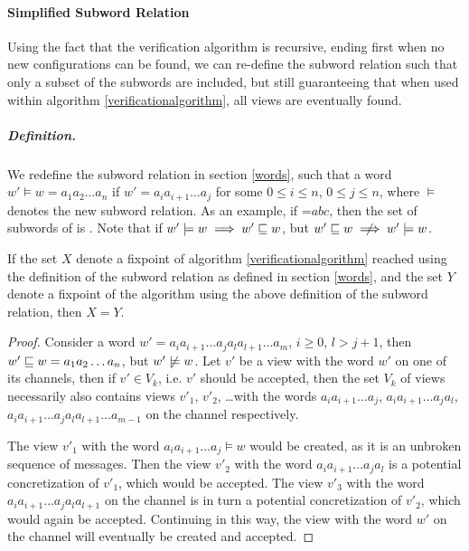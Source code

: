 \paragraph{Simplified Subword Relation}
Using the fact that the verification algorithm is recursive, ending first when no new configurations can be found, we can re-define the subword relation such that only a subset of the subwords are included, but still guaranteeing that when used within algorithm \ref{verificationalgorithm}, all views are eventually found.

\subparagraph{Definition.} 
\label{newsubword}
We redefine the subword relation in section \ref{words}, such that a word $w' \models w = a_1a_2\ldots a_n$ if $w' = a_ia_{i+1}\ldots a_j$ for some $0 \leq i \leq n$, $0 \leq j \leq n$, where $\models$ denotes the new subword relation. As an example, if =$abc$, then the set of subwords of  is . Note that if $w' \models w \implies w' \sqsubseteq w$, but $w' \subword w \centernot\implies w' \models w$. 

\begin{lemma}
If the set $X$ denote a fixpoint of algorithm \ref{verificationalgorithm} reached using the definition of the subword relation as defined in section \ref{words}, and the set $Y$ denote a fixpoint of the algorithm using the above definition of the subword relation, then $X=Y$.
\end{lemma}

\begin{proof}
Consider a word $w' = a_ia_{i+1}\ldots a_ja_la_{l+1}\ldots a_m$, $i \geq 0$, $l > j+1$, then $w' \sqsubseteq w = a_1a_2\ldots a_n$, but $w' \centernot\models w$.
Let $v'$ be a view with the word $w'$ on one of its channels, then if $v' \in V_k$, i.e. $v'$ should be accepted, then the set $V_k$ of views necessarily also contains views $v'_1$, $v'_2$, \ldots with the words $a_ia_{i+1}\ldots a_j$, $a_ia_{i+1}\ldots a_ja_l$, $a_ia_{i+1}\ldots a_ja_la_{l+1}\ldots a_{m-1}$ on the channel respectively.

The view $v'_1$ with the word $a_ia_{i+1}\ldots a_j \models w$ would be created, as it is an unbroken sequence of messages. Then the view $v'_2$ with the word $a_ia_{i+1}\ldots a_ja_l$ is a potential concretization of $v'_1$, which would be accepted. The view $v'_3$ with the word $a_ia_{i+1}\ldots a_ja_la_{l+1}$ on the channel is in turn a potential concretization of $v'_2$, which would again be accepted. Continuing in this way, the view with the word $w'$ on the channel will eventually be created and accepted.
\end{proof}


